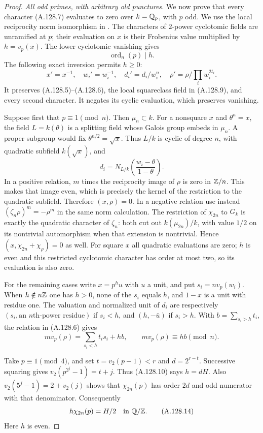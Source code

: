 \begin{proof}
\emph{All odd primes, with arbitrary old punctures.}
We now prove that every character (A.128.7) evaluates
to zero over $k=\mathbb Q_p$, with $p$ odd.
We use the local reciprocity norm isomorphism in
\cite[Theorem 4.1.2]{BIR_KedlayaCFT}.
The characters of $2$-power cyclotomic fields are
unramified at $p$; their evaluation on $x$ is their
Frobenius value multiplied by $h=v_p(x)$.
The lower cyclotomic vanishing gives
\[
                         \operatorname{ord}_{n}(p)\mid h.
\tag{A.128.10}
\]
The following exact inversion permits $h\ge0$:
\[
 x'=x^{-1},\quad w_i'=w_i^{-1},\quad
 d_i'=d_i/w_i^n,\quad
                    \rho'=\rho/\prod_iw_i^{2t_i}.
\tag{A.128.11}
\]
It preserves (A.128.5)--(A.128.6), the local squareclass
field in (A.128.9), and every second character.
It negates its cyclic evaluation, which preserves vanishing.

Suppose first that $p\equiv1\pmod n$.
Then $\mu_n\subset k$.
For a nonsquare $x$ and $\theta^n=x$, the field
$L=k(\theta)$ is a splitting field whose Galois group
embeds in $\mu_n$.
A proper subgroup would fix $\theta^{n/2}=\sqrt x$.
Thus $L/k$ is cyclic of degree $n$, with quadratic
subfield $k(\sqrt x)$, and
\[
       d_i=N_{L/k}\left(\frac{w_i-\theta}{1-\theta}\right).
\tag{A.128.12}
\]
In a positive relation, $m$ times the reciprocity image
of $\rho$ is zero in $\mathbb Z/n$.
This makes that image even, which is precisely the kernel
of the restriction to the quadratic subfield.
Therefore $(x,\rho)=0$.
In a negative relation use instead
$(\zeta_n\rho)^m=-\rho^m$ in the same norm calculation.
The restriction of $\chi_{2n}$ to $G_k$ is exactly
the quadratic character of $\zeta_n$: both cut out
$k(\mu_{2n})/k$, with value $1/2$ on its nontrivial
automorphism when that extension is nontrivial.
Hence $(x,\chi_{2n}+\chi_\rho)=0$ as well.
For square $x$ all quadratic evaluations are zero;
$h$ is even and this restricted cyclotomic character
has order at most two, so its evaluation is also zero.

For the remaining cases write $x=p^hu$ with $u$ a unit,
and put $s_i=nv_p(w_i)$.
When $h\notin n\mathbb Z$ one has $h>0$, none of the $s_i$
equals $h$, and $1-x$ is a unit with residue one.
The valuation and normalized unit of $d_i$ are respectively
$(s_i,\text{an }n\text{th-power residue})$ if $s_i<h$,
and $(h,-\bar u)$ if $s_i>h$.
With
$b=\sum_{s_i>h}t_i$, the relation in (A.128.6) gives
\[
 m v_p(\rho)=\sum_{s_i<h}t_is_i+hb,
                 \qquad m v_p(\rho)\equiv hb\pmod n.
\tag{A.128.13}
\]

Take $p\equiv1\pmod4$, and set $t=v_2(p-1)<r$ and
$d=2^{r-t}$.
Successive squaring gives
$v_2(p^{2^j}-1)=t+j$.
Thus (A.128.10) says $h=dH$.
Also $v_2(5^j-1)=2+v_2(j)$ shows that
$\chi_{2n}(p)$ has order $2d$ and odd numerator with
that denominator.  Consequently
\[
                       h\chi_{2n}(p)=H/2\quad\text{in }\mathbb Q/\mathbb Z.
\tag{A.128.14}
\]
Here $h$ is even.


\end{proof}
